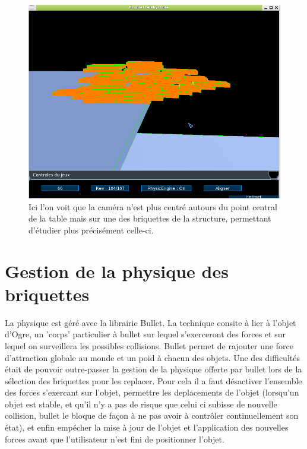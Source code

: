 \documentclass[frenchb,twoside]{EPURapport}
\begin{document}
    \begin{figure}[h]
		\centering
        \includegraphics[width=12cm]{images/bon_score.png}
        \caption{\label{fig:bon_score}Ici l'on voit que la caméra n'est plus centré autours du point
        central de la table mais sur une des briquettes de la structure,
        permettant d'étudier plus précisément celle-ci.}
    \end{figure}

    \section{Gestion de la physique des briquettes}
        La physique est géré avec la librairie Bullet. La technique consite à
        lier à l'objet d'Ogre, un 'corps' particulier à bullet sur lequel
        s'exerceront des forces et sur lequel on surveillera les possibles
        collisions. Bullet permet de rajouter une force d'attraction globale au
        monde et un poid à chacun des objets. Une des difficultés était de
        pouvoir outre-passer la gestion de la physique offerte par bullet lors
        de la sélection des briquettes pour les replacer. Pour cela il a faut
        désactiver l'ensemble des forces s'exercant sur l'objet, permettre les
        deplacements de l'objet (lorsqu'un objet est stable, et qu'il n'y a pas
        de risque que celui ci subisse de nouvelle collision, bullet le bloque
        de façon à ne pas avoir à contrôler continuellement son état), et enfin
        empécher la mise à jour de l'objet et l'application des nouvelles
        forces avant que l'utilisateur n'est fini de positionner l'objet. 

		\
		
\end{document}
